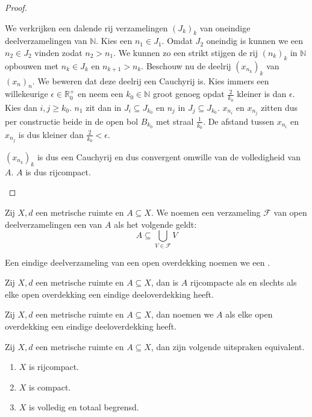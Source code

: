 \documentclass[main.tex]{subfiles}
\begin{document}
\begin{bst}
\begin{proof}
\begin{itemize}
      We verkrijken een dalende rij verzamelingen $(J_{k})_{k}$ van oneindige deelverzamelingen van $\mathbb{N}$. Kies een $n_{1}\in J_{1}$. Omdat $J_{2}$ oneindig is kunnen we een $n_{2}\in J_{2}$ vinden zodat $n_{2} > n_{1}$. We kunnen zo een strikt stijgen de rij $(n_{k})_{k}$ in $\mathbb{N}$ opbouwen met $n_{k}\in J_{k}$ en $n_{k+1} > n_{k}$.
      Beschouw nu de deelrij $(x_{n_{k}})_{k}$ van $(x_{n})_{n}$.
      We beweren dat deze deelrij een Cauchyrij is.
      Kies immers een willekeurige $\epsilon \in \mathbb{R}_{0}^{+}$ en neem een $k_{0}\in \mathbb{N}$ groot genoeg opdat $\frac{2}{k_{0}}$ kleiner is dan $\epsilon$.
      Kies dan $i,j \ge k_{0}$. $n_{1}$ zit dan in $J_{i} \subseteq J_{k_{0}}$ en $n_{j}$ in $J_{j} \subseteq J_{k_{0}}$.
      $x_{n_{i}}$ en $x_{n_{j}}$ zitten dus per constructie beide in de open bol $B_{k_{0}}$ met straal $\frac{1}{k_{0}}$.
      De afstand tussen $x_{n_{i}}$ en $x_{n_{j}}$ is dus kleiner dan $\frac{2}{k_{0}} < \epsilon$.

      $(x_{n_{k}})_{k}$ is dus een Cauchyrij en dus convergent omwille van de volledigheid van $A$.
      $A$ is dus rijcompact.
    \end{itemize}
  \end{proof}
\end{bst}

\begin{de}
  Zij $X,d$ een metrische ruimte en $A \subseteq X$.
  We noemen een verzameling $\mathcal{F}$ van open deelverzamelingen een  van $A$ als het volgende geldt:
  \[ A \subseteq \bigcup_{V \in \mathcal{F}}V \]
\end{de}

\begin{de}
  Een eindige deelverzameling van een open overdekking noemen we een .
\end{de}

\begin{bst}
  Zij $X,d$ een metrische ruimte en $A \subseteq X$, dan is $A$ rijcompacte als en slechts als elke open overdekking een eindige deeloverdekking heeft.
\end{bst}

\begin{de}
  Zij $X,d$ een metrische ruimte en $A \subseteq X$, dan noemen we $A$  als elke open overdekking een eindige deeloverdekking heeft.
\end{de}

\begin{bst}
  Zij $X,d$ een metrische ruimte en $A \subseteq X$, dan zijn volgende uitspraken equivalent.
  \begin{enumerate}
  \item $X$ is rijcompact.
  \item $X$ is compact.
  \item $X$ is volledig en totaal begrensd.
  \end{enumerate}
\end{bst}
\end{document}

